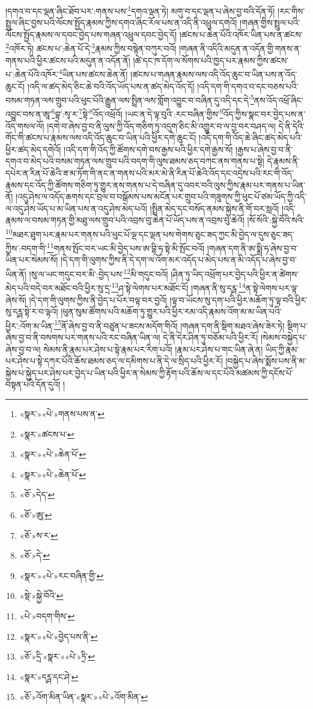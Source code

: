 །དགའ་བ་དང་ལྡན་ཞིང་ཐོབ་པར་:གནས་པས་\footnote{«སྣར་»«པེ་»གནས་པས་ན་}དགའ་ལྡན་ཏེ། མགུ་བ་དང་ལྡན་པ་ཞེས་བྱ་བའི་དོན་ཏོ། །རང་གིས་སྤྲུལ་ཞིང་བྱས་པའི་ལོངས་སྤྱོད་རྣམས་ཀྱིས་དགའ་ཞིང་རོལ་པས་ན་འདི་ནི་འཕྲུལ་དགའོ། །གཞན་གྱིས་སྤྲུལ་པའི་ལོངས་སྤྱོད་རྣམས་ལ་དབང་བྱེད་པས་གཞན་འཕྲུལ་དབང་བྱེད་དོ། །ཚངས་པ་ཆེན་པོའི་འཁོར་ཡིན་པས་ན་ཚངས་\footnote{«སྣར་»ཚངས་པ་}འཁོར་ཏེ། ཚངས་པ་:ཆེན་པོ་དེ་\footnote{«སྣར་»«པེ་»ཆེན་པོ་}རྣམས་ཀྱིས་བསྙེན་བཀུར་བའོ། །གཞན་ནི་འདིའི་མདུན་ན་འདོན་གྱི་གནས་ན་གནས་པའི་ཕྱིར་ཚངས་པའི་མདུན་ན་འདོན་ནོ། །ཚེ་དང་ཁ་དོག་ལ་སོགས་པའི་ཁྱད་པར་རྣམས་ཀྱིས་ཚངས་པ་:ཆེན་པོའི་འཁོར་\footnote{«སྣར་»«པེ་»ཆེན་པོ་}ཡིན་པས་ཚངས་ཆེན་ནོ། །ཚངས་པ་གཞན་རྣམས་ལས་འདི་འོད་ཆུང་བ་ཡིན་པས་ན་འོད་ཆུང་ངོ། །འདི་ལ་ཚད་མེད་ཅིང་ཆེ་བའི་འོད་ཡོད་པས་ན་ཚད་མེད་འོད་དོ། །འདི་དག་གི་དགའ་བ་དང་བཅས་པའི་བསམ་གཏན་ལས་གྲུབ་པའི་ཕུང་པོའི་རྒྱུན་ལས་སྤྲིན་ལས་གློག་འབྱུང་བ་བཞིན་དུ་འདི་དང་དེ་\footnote{«ཅོ་»དེད་}ནས་འོད་འཕྲོ་ཞིང་འབྱུང་བས་ན་ཨཱ་\footnote{«ཅོ་»ཨུ་}བྷ་:སྭ་ར་\footnote{«ཅོ་»ས་ར་}སྟེ་\footnote{«ཅོ་»དེ་}འོད་འཕྲོའོ། །ཡང་ན་དེ་ལྟ་བུའི་:རང་བཞིན་གྱིས་\footnote{«སྣར་»«པེ་»རང་བཞིན་གྱི་}འོད་ཀྱིས་སྣང་བར་བྱེད་པས་ན་འོད་གསལ་ལོ། །དགེ་བ་ཞེས་བྱ་བ་ནི་ལུས་ཀྱི་འོད་གཅིག་ཏུ་འདུག་ཅིང་མི་འགྱུར་བ་ལ་བྱ་བར་བཤད་ལ། དེ་ནི་དེའི་གོང་གི་ཚངས་པ་རྣམས་ལས་འདི་འོད་ཆུང་བ་ཡིན་པའི་ཕྱིར་དགེ་ཆུང་ངོ། །འདི་དག་གི་འོད་ཆེ་ཞིང་ཚད་མེད་པའི་ཕྱིར་ཚད་མེད་དགེའོ། །འདི་དག་གི་འོད་ཀྱི་ཚོགས་དགེ་བས་རྒྱས་པའི་ཕྱིར་དགེ་རྒྱས་སོ། །རྒྱས་པ་ཞེས་བྱ་བ་ནི་དགའ་བ་མེད་པའི་བསམ་གཏན་ལས་གྲུབ་པའི་བདག་གི་ལུས་ཐམས་ཅད་བཀང་ནས་གནས་པ་སྟེ། དེ་རྣམས་ནི་དཔེར་ན་རིན་པོ་ཆེའི་ཟ་མ་ཏོག་གི་ནང་ན་གནས་པའི་མར་མེ་ནི་རིན་པོ་ཆེའི་འོད་དང་འདྲེས་པའི་རང་གི་འོད་རྣམས་དང་འོད་ཀྱི་ཚོགས་གཅིག་ཏུ་གྱུར་ནས་གནས་པ་དེ་བཞིན་དུ་འབར་བའི་ལུས་ཀྱིས་རྣམ་པར་གནས་པ་ཡིན་ནོ། །འདུ་ཤེས་ལ་འདོད་ཆགས་དང་བྲལ་བ་བསྒོམས་པས་མངོན་པར་གྲུབ་པའི་གཟུགས་ཀྱི་ཕུང་པོ་ཙམ་ཡོད་ཀྱི་འདི་ལ་འདུ་ཤེས་ཡོད་པ་མ་ཡིན་པས་ན་འདུ་ཤེས་མེད་པའོ། །སྤྲིན་མེད་དང་བསོད་ནམས་སྐྱེས་ནི་གོ་བར་སླའོ། །འདི་རྣམས་ལ་བསམ་གཏན་གྱི་མཐུ་ལས་གྲུབ་པའི་འབྲས་བུ་ཆེན་པོ་ཡོད་པས་ན་འབྲས་བུ་ཆེའོ། །སོ་སོའི་:སྐྱེ་བོའི་སའི་\footnote{«སྡེ་»སྐྱེ་བོའི་}མཐར་ཐུག་པར་རྣམ་པར་གནས་པའི་ཕུང་པོ་ལྔ་དང་ལྡན་པས་གེགས་ཅུང་ཟད་ཀྱང་མི་བྱེད་ལ་དུས་ཅུང་ཟད་ཀྱིས་:བདག་གི་\footnote{«པེ་»བདག་གིས་}གནས་སྤོང་བར་ཡང་མི་བྱེད་པས་ཨ་བྷི་ཧ་སྟེ་མི་སྤོང་བའོ། །གཞན་དག་ནི་ཨ་སྨྲི་ཧ་ཞེས་བྱ་བ་ཡིན་པར་སེམས་སོ། །དེ་དག་གི་ལུགས་ཀྱིས་ནི་དེ་དག་ལ་འོག་མར་འདོད་པ་མེད་པས་ན་མི་འདོད་པ་ཞེས་བྱ་བ་ཡིན་ནོ། །སུ་ལ་ཡང་གདུང་བར་མི་:བྱེད་པས་\footnote{«སྣར་»«པེ་»བྱེད་པས་ནི་}མི་གདུང་བའོ། །ཤིན་ཏུ་ཡིད་འཕྲོག་པར་བྱེད་པའི་ཕྱིར་ན་ཚེགས་མེད་པའི་བདེ་བར་མཐོང་བའི་ཕྱིར་སུ་དྲ་\footnote{«ཅོ་»དྲི་«སྣར་»«པེ་»ཏྲི་}ཤ་སྟེ་ལེགས་པར་མཐོང་ངོ། །གཞན་ནི་སུ་དཪྴ་\footnote{«སྣར་»དཪྴ་དང་ཤེ་}ན་སྟེ་ལེགས་པར་ལྟ་ཞེས་སོ། །དེ་དག་གི་ལུགས་ཀྱིས་ནི་བྱེད་པ་པོར་བལྟ་བར་བྱའོ། །ལྟ་བ་ཡོངས་སུ་དག་པའི་ཕྱིར་མཆོག་ཏུ་ལྟ་བའི་ཕྱིར་སུ་དཪྴ་སྟེ་ར་བ་ལྟའོ། །ཕུན་སུམ་ཚོགས་པའི་མཆོག་ཏུ་གྱུར་པའི་ཕྱིར་རམ་འདི་རྣམས་འོག་མ་མ་ཡིན་པའི་ཕྱིར་:འོག་མ་ཡིན་\footnote{«ཅོ་»འོག་མིན་ཡིན་«སྣར་»«པེ་»འོག་མིན་}ནོ་ཞེས་བྱ་བ་ནི་བཙུན་པ་ཟངས་མདོག་གིའོ། །གཞན་དག་ནི་སྡིག་མཐའ་ཞེས་ཟེར་ཏེ། སྡིག་པ་ཞེས་བྱ་བ་ནི་བསགས་པར་གནས་པའི་རང་བཞིན་ཡིན་ལ། དེ་ནི་དེར་ཤིན་ཏུ་བཅོམ་པའི་ཕྱིར་རོ། །སེམས་བསྐྱེད་པ་ཞེས་བྱ་བ་ལ། སེམས་ནི་རྣམ་པར་ཤེས་པ་སྟེ་རྣམ་པར་རིག་པའོ། །རྣམ་པར་ཤེས་པ་གང་ཡིན་ཞེ་ན། ཡིད་ཀྱི་རྣམ་པར་ཤེས་པ་སྟེ་དཀར་པོའི་ཆོས་ཐམས་ཅད་ལ་དམིགས་པ་ནི་དེ་ལ་སྲིད་པའི་ཕྱིར་རོ། །བསྐྱེད་པ་ཞེས་སྨོས་པས་ནི་མ་སྐྱེས་པ་སྐྱེད་པར་ཤེས་པར་བྱེད་པ་ཡིན་པའི་ཕྱིར་ན་སེམས་ཀྱི་རྟོག་པའི་ཆོས་ལ་དང་པོའི་མཚམས་ཀྱི་དངོས་པོ་བསྟན་པའི་དོན་དུའོ། །
